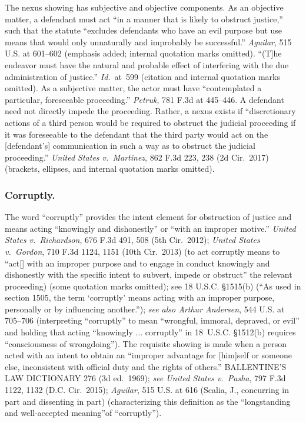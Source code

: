 The nexus showing has subjective and objective components.
As an objective matter, a defendant must act “in a manner that is likely to obstruct justice,” such that the statute “excludes defendants who have an evil purpose but use means that would only unnaturally and improbably be successful.”
\textit{Aguilar}, 515 U.S. at 601--602 (emphasis added; internal quotation marks omitted).
“(T]he endeavor must have the natural and probable effect of interfering with the due administration of justice.”
\textit{Id.}~at~599 (citation and internal quotation marks omitted).
As a subjective matter, the actor must have “contemplated a particular, foreseeable proceeding.”
\textit{Petruk}, 781 F.3d at 445--446.
A defendant need not directly impede the proceeding.
Rather, a nexus exists if “discretionary actions of a third person would be required to obstruct the judicial proceeding if it was foreseeable to the defendant that the third party would act on the [defendant’s] communication in such a way as to obstruct the judicial proceeding.”
\textit{United States v.\ Martinez}, 862 F.3d 223, 238 (2d Cir.~2017) (brackets, ellipses, and internal quotation marks omitted).

\subsubsection*{Corruptly.}

The word “corruptly” provides the intent element for obstruction of justice and means acting “knowingly and dishonestly” or “with an improper motive.”
\textit{United States v.\ Richardson}, 676 F.3d 491, 508 (5th Cir.~2012);
\textit{United States v.\ Gordon}, 710 F.3d 1124, 1151 (10th Cir.~2013) (to act corruptly means to “act[] with an improper purpose and to engage in conduct knowingly and dishonestly with the specific intent to subvert, impede or obstruct” the relevant proceeding) (some quotation marks omitted);
see 18 U.S.C. \S 1515(b) (“As used in section 1505, the term ‘corruptly’ means acting with an improper purpose, personally or by influencing another.”);
\textit{see also Arthur Andersen}, 544 U.S. at 705--706 (interpreting “corruptly” to mean “wrongful, immoral, depraved, or evil” and holding that acting “knowingly ... corruptly” in 18~U.S.C. \S 1512(b) requires “consciousness of wrongdoing”).
The requisite showing is made when a person acted with an intent to obtain an “improper advantage for [him]self or someone else, inconsistent with official duty and the rights of others.”
BALLENTINE’S LAW DICTIONARY 276 (3d ed.~1969);
\textit{see United States v.\ Pasha}, 797 F.3d 1122, 1132 (D.C. Cir.~2015);
\textit{Aguilar}, 515 U.S. at 616 (Scalia, J., concurring in part and dissenting in part) (characterizing this definition as the “longstanding and well-accepted meaning”of “corruptly”).

